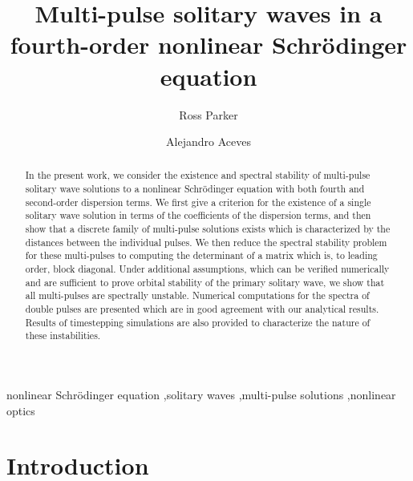 \documentclass[12pt]{elsarticle}
\begin{document}
\begin{frontmatter}

\title{Multi-pulse solitary waves in a fourth-order nonlinear {S}chr{\"o}dinger equation}

\author[1]{Ross Parker}
\author[1]{Alejandro Aceves}

\address[1]{Department of Mathematics, Southern Methodist University, Dallas, Texas 75275}

\begin{abstract}
In the present work, we consider the existence and spectral stability of multi-pulse solitary wave solutions to a nonlinear Schr\"odinger equation with both fourth and second-order dispersion terms. We first give a criterion for the existence of a single solitary wave solution in terms of the coefficients of the dispersion terms, and then show that a discrete family of multi-pulse solutions exists which is characterized by the distances between the individual pulses. We then reduce the spectral stability problem for these multi-pulses to computing the determinant of a matrix which is, to leading order, block diagonal. Under additional assumptions, which can be verified numerically and are sufficient to prove orbital stability of the primary solitary wave, we show that all multi-pulses are spectrally unstable. Numerical computations for the spectra of double pulses are presented which are in good agreement with our analytical results. Results of timestepping simulations are also provided to characterize the nature of these instabilities.
\end{abstract}

\begin{keyword}
nonlinear Schr\"{o}dinger equation \sep solitary waves \sep multi-pulse solutions \sep nonlinear optics 
\end{keyword}

\end{frontmatter}

\section{Introduction}
\end{document}

